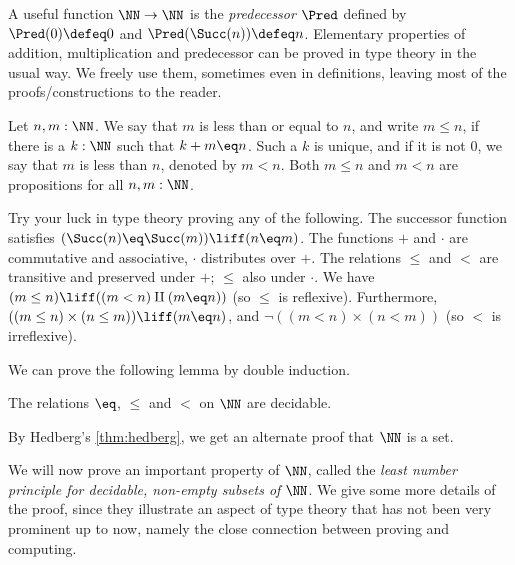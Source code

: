 A useful function $\NN\to\NN$ is the \emph{predecessor} $\Pred$ defined by
$\Pred(0)\defeq 0$ and $\Pred(\Succ(n))\defeq n$.
Elementary properties of addition, multiplication and predecessor
can be proved in type theory in the usual way.
We freely use them, sometimes even in definitions, leaving most of the
proofs/constructions to the reader.

\begin{definition}
\label{def:orderonN}
Let $n,m:\NN$. We say that $m$ is less than or equal to $n$, and write $m\leq n$,
if there is a $k:\NN$ such that $k+m \eq n$. Such a $k$ is unique, and if it
is not $0$, we say that $m$ is less than $n$, denoted by $m<n$.
Both $m\leq n$ and $m<n$ are propositions for all $n,m:\NN$.
\end{definition}

\begin{xca}\label{xca:try-your-luck-N}
Try your luck in type theory proving any of the following.
The successor function satisfies $(\Succ(n) \eq \Succ(m))\liff(n \eq m)$.
The functions $+$ and $\cdot$ are commutative and associative,
$\cdot$ distributes over $+$.
The relations $\leq$ and $<$ are transitive and
preserved under $+$; $\leq$ also under $\cdot$.
We have $(m\leq n) \liff ((m<n)\amalg(m \eq n))$ (so $\leq$ is reflexive).
Furthermore, $((m\leq n)\times (n\leq m)) \liff (m \eq n)$,
and $\neg ((m<n)\times(n<m))$ (so $<$ is irreflexive).
\end{xca}

We can prove the following lemma by double induction.

\begin{lemma}\label{lem:dec-eq+order-N}
The relations $\eq$, $\leq$ and $<$ on $\NN$ are decidable.
\end{lemma}
By Hedberg's \cref{thm:hedberg}, we get an alternate proof that $\NN$ is a set.

We will now prove an important property of $\NN$, called the
\emph{least number principle for decidable, non-empty subsets of} $\NN$.
We give some more details of the proof, since they illustrate an aspect
of type theory that has not been very prominent up to now, namely
the close connection between proving and computing.

